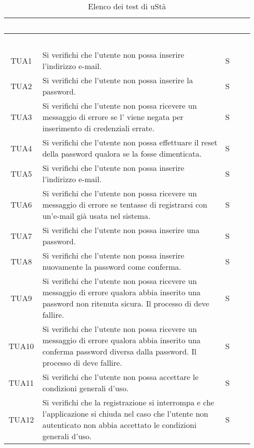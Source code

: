 {
\renewcommand{\arraystretch}{1.5}
\centering
\begin{longtable}{ c C{13cm} C{1cm}}
\caption{Elenco dei test di uStà}\\
\textcolor{white}{\textbf{Codice}} & \textcolor{white}{\textbf{Descrizione}} & \textcolor{white}{\textbf{Stato}}\\
\endfirsthead
{}
\textcolor{white}{\textbf{Codice}} & \textcolor{white}{\textbf{Descrizione}} & \textcolor{white}{\textbf{Stato}}\\
\endhead

TUA1 & Si verifichi che l'utente non  possa inserire l'indirizzo e-mail. & S \\
TUA2 & Si verifichi che l'utente non  possa inserire la password. & S \\
TUA3 & Si verifichi che l'utente non  possa ricevere un messaggio di errore se l' viene negata per inserimento di credenziali errate. & S \\
TUA4 & Si verifichi che l'utente non  possa effettuare il reset della password qualora se la fosse dimenticata. & S \\
TUA5 & Si verifichi che l’utente non  possa inserire l'indirizzo e-mail. & S \\
TUA6 & Si verifichi che l’utente non  possa ricevere un messaggio di errore se tentasse di registrarsi con un'e-mail già usata nel sistema.  & S \\
TUA7 & Si verifichi che l’utente non  possa inserire una password. & S \\
TUA8 & Si verifichi che l’utente non  possa inserire nuovamente la password come conferma. & S \\
TUA9 & Si verifichi che l’utente non  possa ricevere un messaggio di errore qualora abbia inserito una password non ritenuta sicura. Il processo di  deve fallire. & S \\
TUA10 & Si verifichi che l’utente non  possa ricevere un messaggio di errore qualora abbia inserito una conferma password diversa dalla password. Il processo di  deve fallire. & S \\
TUA11 & Si verifichi che l’utente non  possa accettare le condizioni generali d'uso. & S \\
TUA12 & Si verifichi che la registrazione si interrompa e che l'applicazione si chiuda nel caso che l'utente non autenticato non abbia accettato le condizioni generali d'uso. & S \\

\end{longtable}}

